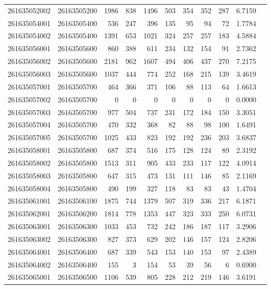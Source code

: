 \documentclass[11pt,landscape]{article}
\begin{document}
{\begin{longtable}[]{@{}lrrrrrrrrrr@{}}
261635052002 & 26163505200 & 1986 & 838 & 1496 & 503 & 354 & 352 & 287 & 6.7159 \\
261635054001 & 26163505400 & 536 & 247 & 396 & 135 & 95 & 94 & 72 & 1.7784 \\
261635054002 & 26163505400 & 1391 & 653 & 1021 & 324 & 257 & 257 & 183 & 4.5884 \\
261635056001 & 26163505600 & 860 & 388 & 611 & 234 & 132 & 154 & 91 & 2.7362 \\
261635056002 & 26163505600 & 2181 & 962 & 1607 & 494 & 406 & 437 & 270 & 7.2175 \\
261635056003 & 26163505600 & 1037 & 444 & 774 & 252 & 168 & 215 & 139 & 3.4619 \\
261635057001 & 26163505700 & 464 & 366 & 371 & 106 & 88 & 113 & 64 & 1.6613 \\
261635057002 & 26163505700 & 0 & 0 & 0 & 0 & 0 & 0 & 0 & 0.0000 \\
261635057003 & 26163505700 & 977 & 504 & 737 & 231 & 172 & 184 & 150 & 3.3051 \\
261635057004 & 26163505700 & 470 & 332 & 368 & 82 & 88 & 98 & 100 & 1.6491 \\
261635057005 & 26163505700 & 1025 & 433 & 823 & 192 & 192 & 236 & 203 & 3.6837 \\
261635058001 & 26163505800 & 687 & 374 & 516 & 175 & 128 & 124 & 89 & 2.3192 \\
261635058002 & 26163505800 & 1513 & 311 & 905 & 433 & 233 & 117 & 122 & 4.0914 \\
261635058003 & 26163505800 & 647 & 315 & 473 & 131 & 111 & 146 & 85 & 2.1169 \\
261635058004 & 26163505800 & 490 & 199 & 327 & 118 & 83 & 83 & 43 & 1.4704 \\
261635061001 & 26163506100 & 1875 & 744 & 1379 & 507 & 319 & 336 & 217 & 6.1871 \\
261635062001 & 26163506200 & 1814 & 778 & 1353 & 447 & 323 & 333 & 250 & 6.0731 \\
261635063001 & 26163506300 & 1033 & 453 & 732 & 242 & 186 & 187 & 117 & 3.2906 \\
261635063002 & 26163506300 & 827 & 373 & 629 & 202 & 146 & 157 & 124 & 2.8206 \\
261635064001 & 26163506400 & 687 & 339 & 543 & 153 & 140 & 153 & 97 & 2.4389 \\
261635064002 & 26163506400 & 155 & 3 & 154 & 53 & 39 & 56 & 6 & 0.6900 \\
261635065001 & 26163506500 & 1106 & 539 & 805 & 228 & 212 & 219 & 146 & 3.6191 \\

\end{longtable}}
\end{document}
